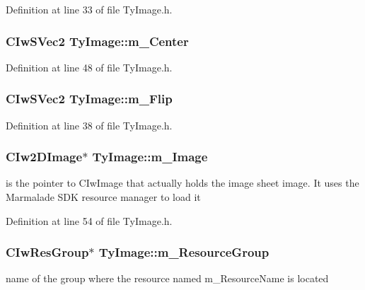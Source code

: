 Definition at line 33 of file TyImage.h.

\hypertarget{class_ty_image_a99aad782345362b97874eb63331aade0}{
\subsubsection[{m\_\-Center}]{\setlength{\rightskip}{0pt plus 5cm}CIwSVec2 {\bf TyImage::m\_\-Center}}}
\label{class_ty_image_a99aad782345362b97874eb63331aade0}


Definition at line 48 of file TyImage.h.

\hypertarget{class_ty_image_acf79c8bc250ac9f0c630d8cc77376284}{
\subsubsection[{m\_\-Flip}]{\setlength{\rightskip}{0pt plus 5cm}CIwSVec2 {\bf TyImage::m\_\-Flip}}}
\label{class_ty_image_acf79c8bc250ac9f0c630d8cc77376284}


Definition at line 38 of file TyImage.h.

\hypertarget{class_ty_image_ae087e8e0af860b1b8e0df36fe28b591f}{
\subsubsection[{m\_\-Image}]{\setlength{\rightskip}{0pt plus 5cm}CIw2DImage$\ast$ {\bf TyImage::m\_\-Image}}}
\label{class_ty_image_ae087e8e0af860b1b8e0df36fe28b591f}
is the pointer to CIwImage that actually holds the image sheet image. It uses the Marmalade SDK resource manager to load it 

Definition at line 54 of file TyImage.h.

\hypertarget{class_ty_image_a4b278a1be30ad7f5abc47f008bbbdfc4}{
\subsubsection[{m\_\-ResourceGroup}]{\setlength{\rightskip}{0pt plus 5cm}CIwResGroup$\ast$ {\bf TyImage::m\_\-ResourceGroup}}}
\label{class_ty_image_a4b278a1be30ad7f5abc47f008bbbdfc4}
name of the group where the resource named m\_\-ResourceName is located 

